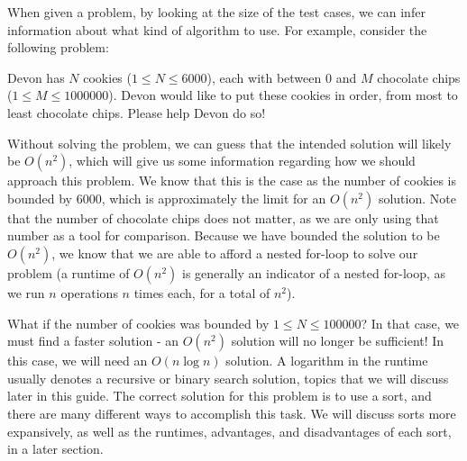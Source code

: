 When given a problem, by looking at the size of the test cases, we can infer information about what kind of algorithm to use.  For example, consider the following problem:

\begin{Problem}
Devon has $ N $ cookies ($ 1 \leq N \leq 6000 $), each with between $ 0 $ and $ M $ chocolate chips ($ 1 \leq M \leq 1000000 $).  Devon would like to put these cookies in order, from most to least chocolate chips.  Please help Devon do so!
\end{Problem}

Without solving the problem, we can guess that the intended solution will likely be $ O(n^2) $, which will give us some information regarding how we should approach this problem.  We know that this is the case as the number of cookies is bounded by $ 6000 $, which is approximately the limit for an $ O(n^2) $ solution.  Note that the number of chocolate chips does not matter, as we are only using that number as a tool for comparison.  Because we have bounded the solution to be $ O(n^2) $, we know that we are able to afford a nested for-loop to solve our problem (a runtime of $ O(n^2) $ is generally an indicator of a nested for-loop, as we run $ n $ operations $ n $ times each, for a total of $ n^2 $).

What if the number of cookies was bounded by $ 1 \leq N \leq 100000 $?  In that case, we must find a faster solution - an $ O(n^2) $ solution will no longer be sufficient! In this case, we will need an $ O(n\log n) $ solution.  A logarithm in the runtime usually denotes a recursive or binary search solution, topics that we will discuss later in this guide.  The correct solution for this problem is to use a sort, and there are many different ways to accomplish this task.  We will discuss sorts more expansively, as well as the runtimes, advantages, and disadvantages of each sort, in a later section.
